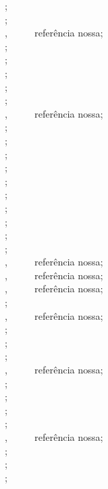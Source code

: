 \begin{apendicesenv}
{\small
    \cite{Alcionep1988} ;\\
    \cite{bart1952} ;\\
    \cite{BibTeX2014} , \ \ \ \ \ referência nossa;\\
    \cite{bioline1998} ;\\
    \cite{birds1998} ;\\
    \cite{cassiano1998} ;\\
    \cite{ceravi1985} ;\\
    \cite{coordena1995} ;\\
    \cite{CTAN2014} , \ \ \ \ \ referência nossa;\\
    \cite{datum1996} ;\\
    \cite{delosmar1997} ;\\
    \cite{drummond1998} ;\\
    \cite{duchamp1918} ;\\
    \cite{espaciais1987} ;\\
    \cite{europa0000} ;\\
    \cite{fagner1988} ;\\
    \cite{gallet1851} ;\\
    \cite{globo1995} ;\\
    \cite{indias0000} ;\\
    \cite{IRL2014} , \ \ \ \ \ referência nossa;\\
    \cite{JabRef2014} , \ \ \ \ \ referência nossa;\\
    \cite{Kile2014} , \ \ \ \ \ referência nossa;\\
    \cite{kobayashi1998} ;\\
    \cite{LaTeX2014} , \ \ \ \ \ referência nossa;\\
    \cite{levi1997} ;\\
    \cite{marinho1995} ;\\
    \cite{mattos1987} ;\\
    \cite{Mendeley2014} , \ \ \ \ \ referência nossa;\\
    \cite{microsoft1995} ;\\
    \cite{mpc1993} ;\\
    \cite{parana1997} ;\\
    \cite{parana1998} ;\\
    \cite{Queiroz2014} , \ \ \ \ \ referência nossa;\\
    \cite{samu1977} ;\\
    \cite{silva1991} ;\\
    \cite{simone1977} ;\\
}
\end{apendicesenv}
